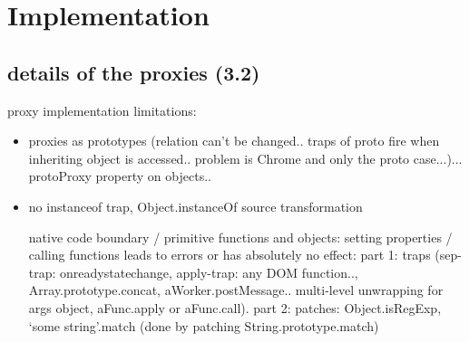 \section{Implementation} \label{sec:IMPLEMENTATION}


\subsection{details of the proxies (3.2)}




proxy implementation limitations: 
\begin{itemize}
    \item proxies as prototypes (relation can’t be changed.. traps of proto fire when inheriting object is accessed.. problem is Chrome and only the proto case...)... protoProxy property on objects..
    \item no instanceof trap, Object.instanceOf source transformation 
    \item [native code] boundary / primitive functions and objects: setting properties / calling functions leads to errors or has absolutely no effect: part 1: traps (sep-trap: onreadystatechange, apply-trap: any DOM function.., Array.prototype.concat, aWorker.postMessage.. multi-level unwrapping for args object, aFunc.apply or aFunc.call).
part 2: patches: Object.isRegExp, ‘some string’.match (done by patching String.prototype.match)
\end{itemize}



